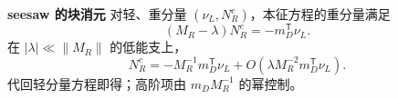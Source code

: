 \par\medskip
\noindent\textbf{seesaw 的块消元}\quad
对轻、重分量 $(\nu_L,N_R^c)$，本征方程的重分量满足
\[
(M_R-\lambda)N_R^c=-m_D^{\mathsf T}\nu_L.
\]
在 $|\lambda|\ll\|M_R\|$ 的低能支上，
\[
N_R^c=-M_R^{-1}m_D^{\mathsf T}\nu_L
+O(\lambda M_R^{-2}m_D^{\mathsf T}\nu_L).
\]
代回轻分量方程即得；高阶项由 $m_DM_R^{-1}$ 的幂控制。
\par\medskip

